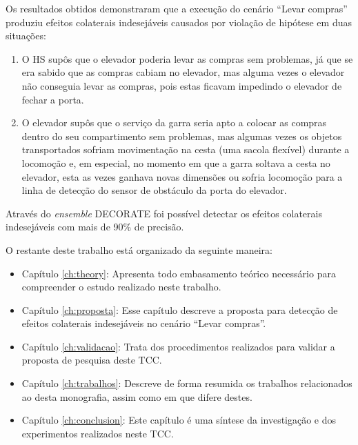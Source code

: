 Os resultados obtidos demonstraram que a execução do cenário ``Levar compras'' produziu efeitos colaterais indesejáveis causados por violação de hipótese em duas situações:

\begin{enumerate}
   \item O HS supôs que o elevador poderia levar as compras sem problemas, já que se era sabido que as compras cabiam no elevador, mas alguma vezes o elevador não conseguia levar as compras, pois estas ficavam impedindo o elevador de fechar a porta.
   \item O elevador supôs que o serviço da garra seria apto a colocar as compras dentro do seu compartimento sem problemas, mas algumas vezes os objetos transportados sofriam movimentação na cesta (uma sacola flexível) durante a locomoção e, em especial, no momento em que a garra soltava a cesta no elevador, esta as vezes ganhava novas dimensões ou sofria locomoção para a linha de detecção do sensor de obstáculo da porta do elevador.
\end{enumerate} 

Através do \textit{ensemble} DECORATE foi possível detectar os efeitos colaterais indesejáveis com mais de 90\% de precisão.

O restante deste trabalho está organizado da seguinte maneira:

\begin{itemize}
\item Capítulo \ref{ch:theory}: Apresenta todo embasamento teórico necessário para compreender o estudo realizado neste trabalho.
\item Capítulo \ref{ch:proposta}: Esse capítulo descreve a proposta para detecção de efeitos colaterais indesejáveis no cenário ``Levar compras''.
\item Capítulo \ref{ch:validacao}: Trata dos procedimentos realizados para validar a proposta de pesquisa deste TCC.
\item Capítulo \ref{ch:trabalhos}: Descreve de forma resumida os trabalhos relacionados ao desta monografia, assim como em que difere destes.
\item Capítulo \ref{ch:conclusion}: Este capítulo é uma síntese da investigação e dos experimentos realizados neste TCC.
\end{itemize}
